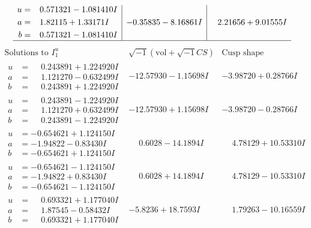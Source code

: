 \documentclass[1p]{elsarticle_modified}
\theoremstyle{definition}
\newcommand{\I}{\sqrt{-1}}
\begin{document}
$$\begin{array}{c|c|c}
\begin{aligned}
u &= \phantom{-}0.571321 - 1.081410 I \\
a &= \phantom{-}1.82115 + 1.33171 I \\
b &= \phantom{-}0.571321 - 1.081410 I\end{aligned}
 & -0.35835 - 8.16861 I & \phantom{-}2.21656 + 9.01555 I\\
 \hline 
 \end{array}$$\newpage$$\begin{array}{c|c|c}  
\text{Solutions to }I^u_{1}& \I (\text{vol} + \sqrt{-1}CS) & \text{Cusp shape}\\
 \hline 
\begin{aligned}
u &= \phantom{-}0.243891 + 1.224920 I \\
a &= \phantom{-}1.121270 - 0.632499 I \\
b &= \phantom{-}0.243891 + 1.224920 I\end{aligned}
 & -12.57930 - 1.15698 I & -3.98720 + 0.28766 I \\ \hline\begin{aligned}
u &= \phantom{-}0.243891 - 1.224920 I \\
a &= \phantom{-}1.121270 + 0.632499 I \\
b &= \phantom{-}0.243891 - 1.224920 I\end{aligned}
 & -12.57930 + 1.15698 I & -3.98720 - 0.28766 I \\ \hline\begin{aligned}
u &= -0.654621 + 1.124150 I \\
a &= -1.94822 - 0.83430 I \\
b &= -0.654621 + 1.124150 I\end{aligned}
 & \phantom{-}0.6028 - 14.1894 I & \phantom{-}4.78129 + 10.53310 I \\ \hline\begin{aligned}
u &= -0.654621 - 1.124150 I \\
a &= -1.94822 + 0.83430 I \\
b &= -0.654621 - 1.124150 I\end{aligned}
 & \phantom{-}0.6028 + 14.1894 I & \phantom{-}4.78129 - 10.53310 I \\ \hline\begin{aligned}
u &= \phantom{-}0.693321 + 1.177040 I \\
a &= \phantom{-}1.87545 - 0.58432 I \\
b &= \phantom{-}0.693321 + 1.177040 I\end{aligned}
 & -5.8236 + 18.7593 I & \phantom{-}1.79263 - 10.16559 I \\ \hline\begin{aligned}

\end{aligned}
\end{array}$$
\end{document}
